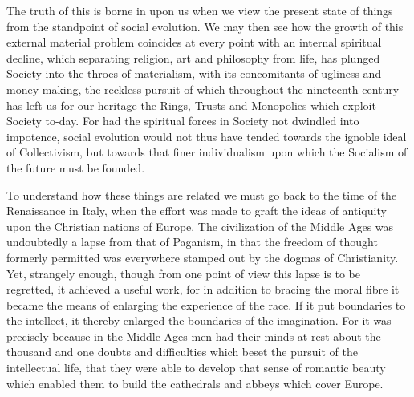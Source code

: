 \documentclass{book}
\begin{document}
The truth of this is borne in upon us when we view the present state of things from the standpoint of social evolution. We may then see how the growth of this external material problem coincides at every point with an internal spiritual decline, which separating religion, art and philosophy from life, has plunged Society into the throes of materialism, with its concomitants of ugliness and money-making, the reckless pursuit of which throughout the nineteenth century has left us for our heritage the Rings, Trusts and Monopolies which exploit Society to-day. For had the spiritual forces in Society not dwindled into impotence, social evolution would not thus have tended towards the ignoble ideal of Collectivism, but towards that finer individualism upon which the Socialism of the future must be founded.

To understand how these things are related we must go back to the time of the Renaissance in Italy, when the effort was made to graft the ideas of antiquity upon the Christian nations of Europe. The civilization of the Middle Ages was undoubtedly a lapse from that of Paganism, in that the freedom of thought formerly permitted was everywhere stamped out by the dogmas of Christianity. Yet, strangely enough, though from one point of view this lapse is to be regretted, it achieved a useful work, for in addition to bracing the moral fibre it became the means of enlarging the experience of the race. If it put boundaries to the intellect, it thereby enlarged the boundaries of the imagination. For it was precisely because in the Middle Ages men had their minds at rest about the thousand and one doubts and difficulties which beset the pursuit of the intellectual life, that they were able to develop that sense of romantic beauty which enabled them to build the cathedrals and abbeys which cover Europe.
\end{document}
